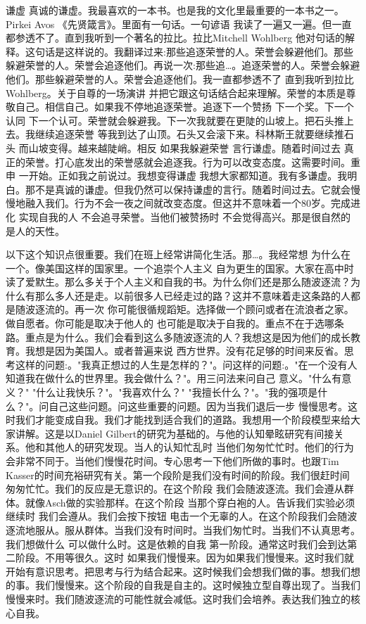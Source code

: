 谦虚 真诚的谦虚。我最喜欢的一本书。也是我的文化里最重要的一本书之一。Pirkei Avos 《先贤箴言》。里面有一句话。一句谚语 我读了一遍又一遍。但一直都参透不了。直到我听到一个著名的拉比。拉比Mitchell Wohlberg 他对句话的解释。这句话是这样说的。我翻译过来:那些追逐荣誉的人。荣誉会躲避他们。那些躲避荣誉的人。荣誉会追逐他们。再说一次:那些追…。追逐荣誉的人。荣誉会躲避他们。那些躲避荣誉的人。荣誉会追逐他们。我一直都参透不了 直到我听到拉比Wohlberg。关于自尊的一场演讲 并把它跟这句话结合起来理解。荣誉的本质是尊敬自己。相信自己。如果我不停地追逐荣誉。追逐下一个赞扬 下一个奖。下一个认同 下一个认可。荣誉就会躲避我。下一次我就要在更陡的山坡上。把石头推上去。我继续追逐荣誉 等我到达了山顶。石头又会滚下来。科林斯王就要继续推石头 而山坡变得。越来越陡峭。相反 如果我躲避荣誉 言行谦虚。随着时间过去 真正的荣誉。打心底发出的荣誉感就会追逐我。行为可以改变态度。这需要时间。重申 一开始。正如我之前说过。我想变得谦虚 我想大家都知道。我有多谦虚。我明白。那不是真诚的谦虚。但我仍然可以保持谦虚的言行。随着时间过去。它就会慢慢地融入我们。行为不会一夜之间就改变态度。但这并不意味着一个80岁。完成进化 实现自我的人 不会追寻荣誉。当他们被赞扬时 不会觉得高兴。那是很自然的 是人的天性。 

以下这个知识点很重要。我们在班上经常讲简化生活。那…。我经常想 为什么在一个。像美国这样的国家里。一个追崇个人主义 自为更生的国家。大家在高中时读了爱默生。那么多关于个人主义和自我的书。为什么你们还是那么随波逐流？为什么有那么多人还是走。以前很多人已经走过的路？这并不意味着走这条路的人都是随波逐流的。再一次 你可能很循规蹈矩。选择做一个顾问或者在流浪者之家。做自愿者。你可能是取决于他人的 也可能是取决于自我的。重点不在于选哪条路。重点是为什么。我们会看到这么多随波逐流的人？我想这是因为他们的成长教育。我想是因为美国人。或者普遍来说 西方世界。没有花足够的时间来反省。思考这样的问题:。"我真正想过的人生是怎样的？"。问这样的问题:。"在一个没有人知道我在做什么的世界里。我会做什么？"。用三问法来问自己 意义。"什么有意义？" "什么让我快乐？"。"我喜欢什么？" "我擅长什么？"。"我的强项是什么？"。问自己这些问题。问这些重要的问题。因为当我们退后一步 慢慢思考。这时我们才能变成自我。我们才能找到适合我们的道路。我想用一个阶段模型来给大家讲解。这是以Daniel Gilbert的研究为基础的。与他的认知晕眩研究有间接关系。他和其他人的研究发现。当人的认知忙乱时 当他们匆匆忙忙时。他们的行为会非常不同于。当他们慢慢花时间。专心思考一下他们所做的事时。也跟Tim Kasser的时间充裕研究有关。第一个段阶是我们没有时间的阶段。我们很赶时间 匆匆忙忙。我们的反应是无意识的。在这个阶段 我们会随波逐流。我们会遵从群体。就像Asch做的实验那样。在这个阶段 当那个穿白袍的人。告诉我们实验必须继续时 我们会遵从。我们会按下按钮 电击一个无辜的人。在这个阶段我们会随波逐流地服从。服从群体。当我们没有时间时。当我们匆忙时。当我们不认真思考。我们想做什么 可以做什么时。这是依赖的自我 第一阶段。通常这时我们会到达第二阶段。不用等很久。这时 如果我们慢慢来。因为如果我们慢慢来。这时我们就开始有意识思考。把思考与行为结合起来。这时候我们会想我们做的事。想我们想的事。我们慢慢来。这个阶段的自我是自主的。这时候独立型自尊出现了。当我们慢慢来时。我们随波逐流的可能性就会减低。这时我们会培养。表达我们独立的核心自我。 

